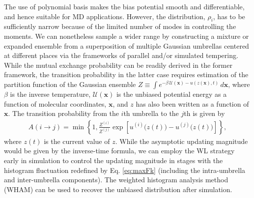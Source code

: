 \documentclass[reprint, superscriptaddress, floatfix]{revtex4-1}
\begin{document}
The use of polynomial basis makes
the bias potential smooth and differentiable,
and hence suitable for MD applications.\cite{zhu2012}
%
However,
the distribution, $\rho_i$,
has to be sufficiently narrow
because of the limited number of modes
in controlling the moments.
%
We can nonetheless sample a wider range
by constructing a mixture or expanded ensemble
from a superposition of multiple Gaussian umbrellas
centered at different places via
the frameworks of
parallel\cite{swendsen1986,
  *geyer1991, *hukushima1996, *hansmann1997, *sugita1999, *earl2005}
and/or simulated tempering\cite{marinari1992,
  *lyubartsev1992, li2007,
  park2007, *nguyen2013, *zhang2015st}.
%
While the mutual exchange probability
can be readily derived in the former
framework\cite{neuhaus2006, *neuhaus2007},
the transition probability in the latter case
requires estimation of the partition function
of the Gaussian ensemble
$Z \equiv \int e^{-\beta \, \mathcal U(\mathbf x)-u(z(\mathbf x),t)} \, d\mathbf x$,
where
$\beta$ is the inverse temperature,
$\mathcal U(\mathbf x)$ is the unbiased potential energy
as a function of molecular coordinates, $\mathbf x$,
and $z$ has also been written as a function of $\mathbf x$.
%
The transition probability from
the $i$th umbrella to the $j$th is given by
\begin{align*}
A(i\to j) =
\min\left\{1,
  \frac{Z^{(i)}}{Z^{(j)}}
  \exp\left[u^{(i)}\bigl( z(t) \bigr)
   - u^{(j)}\bigl( z(t) \bigr) \right]
  \right\}
  ,
\end{align*}
where $z(t)$ is the current value of $z$.
%
While the asymptotic updating magnitude
would be given by the inverse-time formula,
we can employ the WL strategy early in simulation
to control the updating magnitude in stages
with the histogram fluctuation
redefined by Eq. \eqref{eq:maxFk}
(including the intra-umbrella and inter-umbrella
components).
%
The weighted histogram analysis method
(WHAM)\cite{ferrenberg1988, *ferrenberg1989,
*kumar1992, *roux1995, *bartels1997, *souaille2001,
*kobrak2003, *gallicchio2005, *chodera2007, zhu2012, newman, frenkel,
fenwick2008, *kim2011}
can be used to recover the unbiased distribution
after simulation.
%
\end{document}
